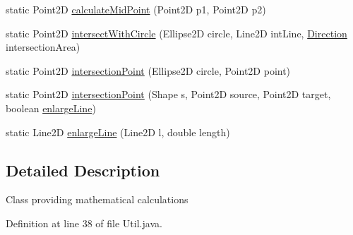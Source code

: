 \begin{DoxyCompactItemize}
\item 
static Point2\-D \hyperlink{classorg_1_1tzi_1_1use_1_1gui_1_1views_1_1diagrams_1_1util_1_1_util_a2b7ac75b94369201ce59a73e20537238}{calculate\-Mid\-Point} (Point2\-D p1, Point2\-D p2)
\item 
static Point2\-D \hyperlink{classorg_1_1tzi_1_1use_1_1gui_1_1views_1_1diagrams_1_1util_1_1_util_a1ed6a8a3247fc3543b0c1d0da84cfe0e}{intersect\-With\-Circle} (Ellipse2\-D circle, Line2\-D int\-Line, \hyperlink{enumorg_1_1tzi_1_1use_1_1gui_1_1views_1_1diagrams_1_1util_1_1_direction}{Direction} intersection\-Area)
\item 
static Point2\-D \hyperlink{classorg_1_1tzi_1_1use_1_1gui_1_1views_1_1diagrams_1_1util_1_1_util_a0098957c8808fec4af5527e2898fb922}{intersection\-Point} (Ellipse2\-D circle, Point2\-D point)
\item 
static Point2\-D \hyperlink{classorg_1_1tzi_1_1use_1_1gui_1_1views_1_1diagrams_1_1util_1_1_util_a179ee4f6368cbb69bfdcaae9951008a7}{intersection\-Point} (Shape s, Point2\-D source, Point2\-D target, boolean \hyperlink{classorg_1_1tzi_1_1use_1_1gui_1_1views_1_1diagrams_1_1util_1_1_util_aaa4eb912e910240715598aa36a02f1e9}{enlarge\-Line})
\item 
static Line2\-D \hyperlink{classorg_1_1tzi_1_1use_1_1gui_1_1views_1_1diagrams_1_1util_1_1_util_aaa4eb912e910240715598aa36a02f1e9}{enlarge\-Line} (Line2\-D l, double length)
\end{DoxyCompactItemize}


\subsection{Detailed Description}
Class providing mathematical calculations 

Definition at line 38 of file Util.\-java.



